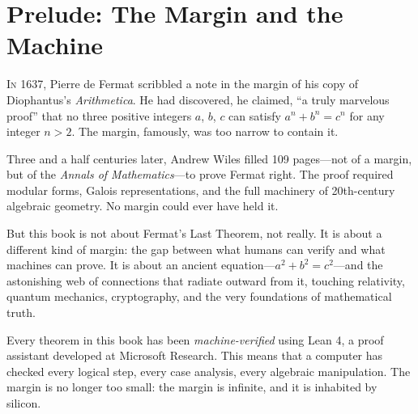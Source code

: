 \documentclass[11pt,twoside,openright]{book}
\theoremstyle{definition}
\begin{document}
\tableofcontents
\cleardoublepage

\chapter*{Prelude: The Margin and the Machine}

\lettrine[lines=3,loversize=0.15]{I}{n 1637}, Pierre de Fermat scribbled
a note in the margin of his copy of Diophantus's \emph{Arithmetica}. He had
discovered, he claimed, ``a truly marvelous proof'' that no three positive
integers $a$, $b$, $c$ can satisfy $a^n + b^n = c^n$ for any integer $n > 2$.
The margin, famously, was too narrow to contain it.

Three and a half centuries later, Andrew Wiles filled 109 pages---not of a
margin, but of the \emph{Annals of Mathematics}---to prove Fermat right.
The proof required modular forms, Galois representations, and the full
machinery of 20th-century algebraic geometry. No margin could ever have held it.

But this book is not about Fermat's Last Theorem, not really. It is about a
different kind of margin: the gap between what humans can verify and what
machines can prove. It is about an ancient equation---$a^2 + b^2 = c^2$---and
the astonishing web of connections that radiate outward from it, touching
relativity, quantum mechanics, cryptography, and the very foundations of
mathematical truth.

Every theorem in this book has been \emph{machine-verified} using Lean 4,
a proof assistant developed at Microsoft Research. This means that a computer
has checked every logical step, every case analysis, every algebraic
manipulation. The margin is no longer too small: the margin is infinite,
and it is inhabited by silicon.
\end{document}
